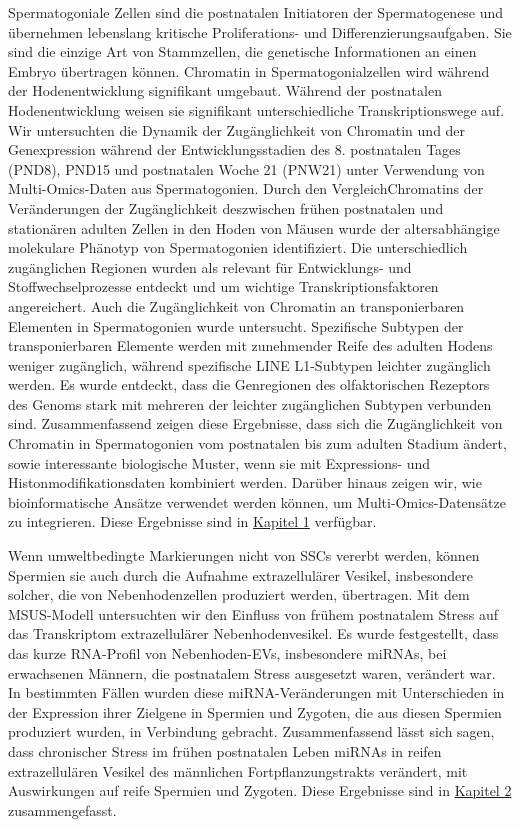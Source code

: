 \documentclass[12pt,twoside]{reedthesis}
\begin{document}
Spermatogoniale Zellen sind die postnatalen Initiatoren der Spermatogenese und übernehmen lebenslang kritische Proliferations- und Differenzierungsaufgaben. Sie sind die einzige Art von Stammzellen, die genetische Informationen an einen Embryo übertragen können. Chromatin in Spermatogonialzellen wird während der Hodenentwicklung signifikant umgebaut. Während der postnatalen Hodenentwicklung weisen sie signifikant unterschiedliche Transkriptionswege auf. Wir untersuchten die Dynamik der Zugänglichkeit von Chromatin und der Genexpression während der Entwicklungsstadien des 8. postnatalen Tages (PND8), PND15 und postnatalen Woche 21 (PNW21) unter Verwendung von Multi-Omics-Daten aus Spermatogonien. Durch den VergleichChromatins der Veränderungen der Zugänglichkeit deszwischen frühen postnatalen und stationären adulten Zellen in den Hoden von Mäusen wurde der altersabhängige molekulare Phänotyp von Spermatogonien identifiziert. Die unterschiedlich zugänglichen Regionen wurden als relevant für Entwicklungs- und Stoffwechselprozesse entdeckt und um wichtige Transkriptionsfaktoren angereichert. Auch die Zugänglichkeit von Chromatin an transponierbaren Elementen in Spermatogonien wurde untersucht. Spezifische Subtypen der transponierbaren Elemente werden mit zunehmender Reife des adulten Hodens weniger zugänglich, während spezifische LINE L1-Subtypen leichter zugänglich werden. Es wurde entdeckt, dass die Genregionen des olfaktorischen Rezeptors des Genoms stark mit mehreren der leichter zugänglichen Subtypen verbunden sind. Zusammenfassend zeigen diese Ergebnisse, dass sich die Zugänglichkeit von Chromatin in Spermatogonien vom postnatalen bis zum adulten Stadium ändert, sowie interessante biologische Muster, wenn sie mit Expressions- und Histonmodifikationsdaten kombiniert werden. Darüber hinaus zeigen wir, wie bioinformatische Ansätze verwendet werden können, um Multi-Omics-Datensätze zu integrieren. Diese Ergebnisse sind in \protect\hyperlink{chapter1}{Kapitel 1} verfügbar.

Wenn umweltbedingte Markierungen nicht von SSCs vererbt werden, können Spermien sie auch durch die Aufnahme extrazellulärer Vesikel, insbesondere solcher, die von Nebenhodenzellen produziert werden, übertragen. Mit dem MSUS-Modell untersuchten wir den Einfluss von frühem postnatalem Stress auf das Transkriptom extrazellulärer Nebenhodenvesikel. Es wurde festgestellt, dass das kurze RNA-Profil von Nebenhoden-EVs, insbesondere miRNAs, bei erwachsenen Männern, die postnatalem Stress ausgesetzt waren, verändert war. In bestimmten Fällen wurden diese miRNA-Veränderungen mit Unterschieden in der Expression ihrer Zielgene in Spermien und Zygoten, die aus diesen Spermien produziert wurden, in Verbindung gebracht. Zusammenfassend lässt sich sagen, dass chronischer Stress im frühen postnatalen Leben miRNAs in reifen extrazellulären Vesikel des männlichen Fortpflanzungstrakts verändert, mit Auswirkungen auf reife Spermien und Zygoten. Diese Ergebnisse sind in \protect\hyperlink{chapter2}{Kapitel 2} zusammengefasst.
\end{document}
